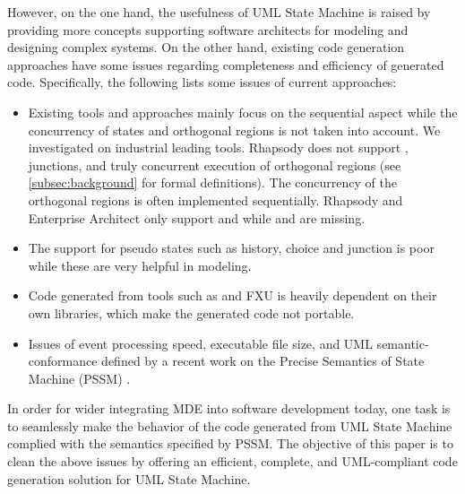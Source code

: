 However, on the one hand, the usefulness of UML State Machine is raised by providing more concepts supporting software architects for modeling and designing complex systems. 
On the other hand, existing code generation approaches have some issues regarding completeness and efficiency of generated code. 
Specifically, the following lists some issues of current approaches: 
\begin{itemize}
	\setlength\itemsep{0em}
	\item Existing tools and approaches mainly focus on the sequential aspect while the concurrency of  states and orthogonal regions is not taken into account. We investigated on industrial leading tools. Rhapsody does not support , junctions, and truly concurrent execution of orthogonal regions
	\cite{ibmdiff} (see \ref{subsec:background} for formal definitions). 
	The concurrency of the orthogonal regions is often implemented sequentially. 
	Rhapsody and Enterprise Architect \cite{EA} only support  and  while  and  are missing. 
	
	\item The support for pseudo states such as history, choice and junction is poor \cite{EA, sinelabore} while these are very helpful in modeling.
	
	\item Code generated from tools such as \cite{ibm_rhapsody} and FXU \cite{Pilitowski2007} is heavily dependent on their own libraries, which make the generated code not portable.
	
	\item Issues of event processing speed, executable file size, and UML semantic-conformance defined by a recent work on the Precise Semantics of State Machine (PSSM) \cite{OMG2015}. 
\end{itemize}

In order for wider integrating MDE into software development today, one task is to seamlessly make the behavior of the code generated from UML State Machine complied with the semantics specified by PSSM. 
The objective of this paper is to clean the above issues by offering an efficient, complete, and UML-compliant code generation solution for UML State Machine.   

